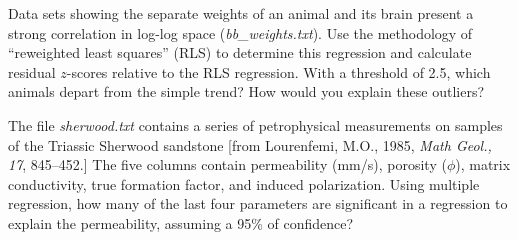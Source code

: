 \begin{problem}
Data sets showing the separate weights of an animal and its brain present a strong correlation in log-log space (\emph{bb\_weights.txt}).
Use the methodology of ``reweighted least squares'' (RLS) to determine this regression and calculate residual $z$-scores
relative to the RLS regression. With a threshold of 2.5, which animals depart from the simple trend? How would you
explain these outliers?
\end{problem}

\begin{problem}
	The file \emph{sherwood.txt} contains a series of petrophysical measurements on samples
	of the Triassic Sherwood sandstone [from Lourenfemi, M.O., 1985, \emph{Math Geol., 17}, 845--452.]
	The five columns contain permeability (mm/s), porosity ($\phi$), matrix
	conductivity, true formation factor, and induced polarization.  Using multiple regression,
	how many of the last four parameters are significant in a regression to explain the permeability,
	assuming a 95\% of confidence?
\end{problem}
